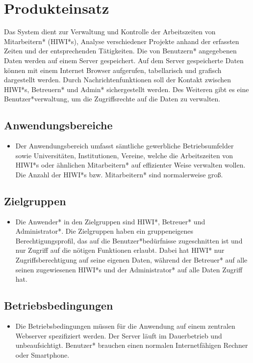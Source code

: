 \section{Produkteinsatz}
Das System dient zur Verwaltung und Kontrolle der Arbeitszeiten von Mitarbeitern* (HIWI*s), Analyse verschiedener Projekte anhand der erfassten Zeiten und der entsprechenden Tätigkeiten. Die von Benutzern* angegebenen Daten werden auf einem Server gespeichert. Auf dem Server gespeicherte Daten können mit einem Internet Browser aufgerufen, tabellarisch und grafisch dargestellt werden. Durch Nachrichtenfunktionen soll der Kontakt zwischen HIWI*s, Betreuern* und Admin* sichergestellt werden. Des Weiteren gibt es eine Benutzer*verwaltung, um die Zugriffsrechte auf die Daten zu verwalten.
\subsection{Anwendungsbereiche}
\begin{itemize}
	\item Der Anwendungsbereich umfasst sämtliche gewerbliche Betriebsumfelder sowie Universitäten, Institutionen, Vereine, welche die Arbeitszeiten von HIWI*s oder ähnlichen Mitarbeitern* auf effizienter Weise verwalten wollen. Die Anzahl der HIWI*s bzw. Mitarbeitern* sind normalerweise groß. 
\end{itemize}

\subsection{Zielgruppen}
\begin{itemize}
	\item Die Anwender* in den Zielgruppen sind HIWI*, Betreuer* und Administrator*. Die Zielgruppen haben ein gruppeneigenes Berechtigungsprofil, das auf die Benutzer*bedürfnisse zugeschnitten ist und nur Zugriff auf die nötigen Funktionen erlaubt. Dabei hat HIWI* nur Zugriffsberechtigung auf seine eigenen Daten, während der Betreuer* auf alle seinen zugewiesenen HIWI*s und der Administrator* auf alle Daten Zugriff hat.
\end{itemize}

\subsection{Betriebsbedingungen}
\begin{itemize}
	\item Die Betriebsbedingungen müssen für die Anwendung auf einem zentralen Webserver spezifiziert werden. Der Server läuft im Dauerbetrieb und unbeaufsichtigt. Benutzer* brauchen einen normalen Internetfähigen Rechner oder Smartphone.
\end{itemize}
